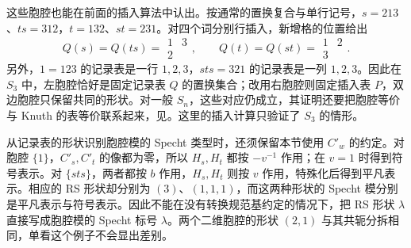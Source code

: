 \ProseParagraphBreak
这些胞腔也能在前面的插入算法中认出。按通常的置换复合与单行记号，\(s=213\)、\(ts=312\)，\(t=132\)、\(st=231\)。对四个词分别行插入，新增格的位置给出
\[
	Q(s)=Q(ts)=\begin{array}{cc}1&3\\2&\end{array},
	\qquad
	Q(t)=Q(st)=\begin{array}{cc}1&2\\3&\end{array}.
\]
另外，\(1=123\) 的记录表是一行 \(1,2,3\)，\(sts=321\) 的记录表是一列 \(1,2,3\)。因此在 \(S_3\) 中，左胞腔恰好是固定记录表 \(Q\) 的置换集合；改用右胞腔则固定插入表 \(P\)，双边胞腔只保留共同的形状。对一般 \(S_n\)，这些对应仍成立，其证明还要把胞腔等价与 Knuth 的表等价联系起来，见\cite[Section 5, pp. 176--177]{KazhdanLusztig1979Hecke}。这里的插入计算只验证了 \(S_3\) 的情形。

\ProseParagraphBreak
从记录表的形状识别胞腔模的 Specht 类型时，还须保留本节使用 \(C'_w\) 的约定。对胞腔 \(\{1\}\)，\(C'_s,C'_t\) 的像都为零，所以 \(H_s,H_t\) 都按 \(-v^{-1}\) 作用；在 \(v=1\) 时得到符号表示。对 \(\{sts\}\)，两者都按 \(b\) 作用，\(H_s,H_t\) 则按 \(v\) 作用，特殊化后得到平凡表示。相应的 RS 形状却分别为 \((3)\)、\((1,1,1)\)，而这两种形状的 Specht 模分别是平凡表示与符号表示。因此不能在没有转换规范基约定的情况下，把 RS 形状 \(\lambda\) 直接写成胞腔模的 Specht 标号 \(\lambda\)。两个二维胞腔的形状 \((2,1)\) 与其共轭分拆相同，单看这个例子不会显出差别。
